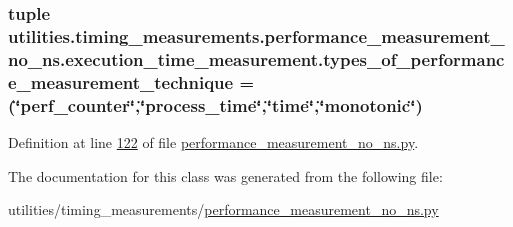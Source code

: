 \hypertarget{classutilities_1_1timing__measurements_1_1performance__measurement__no__ns_1_1execution__time__measurement_aa73046ac445a5731739e52ae5034c4a1}{}
\subsubsection[{types\+\_\+of\+\_\+performance\+\_\+measurement\+\_\+technique}]{\setlength{\rightskip}{0pt plus 5cm}tuple utilities.\+timing\+\_\+measurements.\+performance\+\_\+measurement\+\_\+no\+\_\+ns.\+execution\+\_\+time\+\_\+measurement.\+types\+\_\+of\+\_\+performance\+\_\+measurement\+\_\+technique = (\char`\"{}perf\+\_\+counter\char`\"{},\char`\"{}process\+\_\+time\char`\"{},\char`\"{}time\char`\"{},\char`\"{}monotonic\char`\"{})\hspace{0.3cm}{\ttfamily [static]}}\label{classutilities_1_1timing__measurements_1_1performance__measurement__no__ns_1_1execution__time__measurement_aa73046ac445a5731739e52ae5034c4a1}


Definition at line \hyperlink{performance__measurement__no__ns_8py_source_l00122}{122} of file \hyperlink{performance__measurement__no__ns_8py_source}{performance\+\_\+measurement\+\_\+no\+\_\+ns.\+py}.



The documentation for this class was generated from the following file\+:\begin{DoxyCompactItemize}
\item 
utilities/timing\+\_\+measurements/\hyperlink{performance__measurement__no__ns_8py}{performance\+\_\+measurement\+\_\+no\+\_\+ns.\+py}\end{DoxyCompactItemize}
